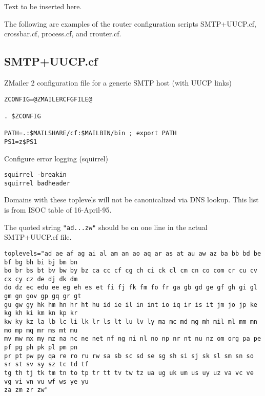 
Text to be inserted here.

The following are examples of the router configuration scripts SMTP+UUCP.cf, crossbar.cf, process.cf, and rrouter.cf.




\subsection{SMTP+UUCP.cf}

ZMailer 2 configuration file for a generic SMTP host (with UUCP links)

\begin{tscreen}
\begin{verbatim}
ZCONFIG=@ZMAILERCFGFILE@

. $ZCONFIG

PATH=.:$MAILSHARE/cf:$MAILBIN/bin ; export PATH
PS1=z$PS1
\end{verbatim}
\end{tscreen}


Configure error logging (squirrel)

\begin{tscreen}
\begin{verbatim}
squirrel -breakin
squirrel badheader
\end{verbatim}
\end{tscreen}


Domains with these toplevels will not be canonicalized via DNS lookup.
This list is from ISOC table of 16-April-95.

The quoted string {\tt "ad...zw"} should be on one line in the actual SMTP+UUCP.cf file.

\begin{tscreen}
\begin{verbatim}
toplevels="ad ae af ag ai al am an ao aq ar as at au aw az ba bb bd be bf bg bh bi bj bm bn 
bo br bs bt bv bw by bz ca cc cf cg ch ci ck cl cm cn co com cr cu cv cx cy cz de dj dk dm 
do dz ec edu ee eg eh es et fi fj fk fm fo fr ga gb gd ge gf gh gi gl gm gn gov gp gq gr gt 
gu gw gy hk hm hn hr ht hu id ie il in int io iq ir is it jm jo jp ke kg kh ki km kn kp kr 
kw ky kz la lb lc li lk lr ls lt lu lv ly ma mc md mg mh mil ml mm mn mo mp mq mr ms mt mu 
mv mw mx my mz na nc ne net nf ng ni nl no np nr nt nu nz om org pa pe pf pg ph pk pl pm pn 
pr pt pw py qa re ro ru rw sa sb sc sd se sg sh si sj sk sl sm sn so sr st sv sy sz tc td tf 
tg th tj tk tm tn to tp tr tt tv tw tz ua ug uk um us uy uz va vc ve vg vi vn vu wf ws ye yu 
za zm zr zw"
\end{verbatim}
\end{tscreen}


